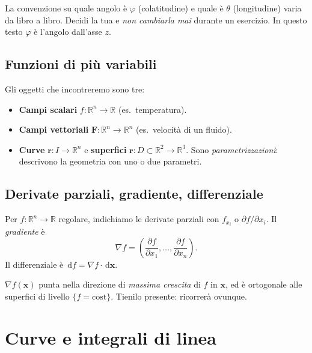 \documentclass[11pt,a4paper,openany]{book}
\theoremstyle{plain}
\theoremstyle{definition}
\theoremstyle{remark}
\newcommand{\R}{\mathbb{R}}
\newcommand{\dd}{\,\mathrm{d}}
\renewcommand{\vec}[1]{\mathbf{#1}}
\newcommand{\F}{\mathbf{F}}
\newcommand{\rr}{\mathbf{r}}
\begin{document}
\begin{trappola}
La convenzione su quale angolo \`e $\varphi$ (colatitudine) e quale \`e $\theta$
(longitudine) varia da libro a libro. Decidi la tua e \emph{non cambiarla mai}
durante un esercizio. In questo testo $\varphi$ \`e l'angolo dall'asse $z$.
\end{trappola}

\section{Funzioni di pi\`u variabili}

Gli oggetti che incontreremo sono tre:
\begin{itemize}[leftmargin=*]
  \item \textbf{Campi scalari} $f:\R^n\to\R$ (es.\ temperatura).
  \item \textbf{Campi vettoriali} $\F:\R^n\to\R^n$ (es.\ velocit\`a di un fluido).
  \item \textbf{Curve} $\rr:I\to\R^n$ e \textbf{superfici} $\rr:D\subset\R^2\to\R^3$.
        Sono \emph{parametrizzazioni}: descrivono la geometria con uno o due
        parametri.
\end{itemize}

\section{Derivate parziali, gradiente, differenziale}

Per $f:\R^n\to\R$ regolare, indichiamo le derivate parziali con $f_{x_i}$ o
$\partial f/\partial x_i$. Il \emph{gradiente} \`e
\begin{equation}
  \nabla f=\left(\frac{\partial f}{\partial x_1},\dots,\frac{\partial f}{\partial x_n}\right).
  \label{eq:gradiente-def}
\end{equation}
Il differenziale \`e $\dd f=\nabla f\cdot\dd\vec{x}$.

\begin{nota}
$\nabla f(\vec{x})$ punta nella direzione di \emph{massima crescita} di $f$ in
$\vec{x}$, ed \`e ortogonale alle superfici di livello $\{f=\text{cost}\}$.
Tienilo presente: ricorrer\`a ovunque.
\end{nota}

\chapter{Curve e integrali di linea}
\end{document}
